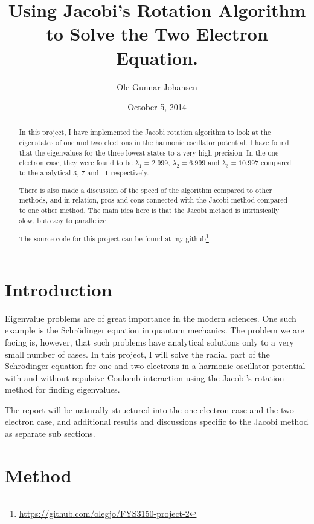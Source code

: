 \documentclass[11pt, a4paper]{article}
\title{Using Jacobi's Rotation Algorithm to Solve the Two Electron \SL Equation.}
\date{October 5, 2014}
\author{Ole Gunnar Johansen}
\newcommand{\SL}{Schr\"{o}dinger }
\begin{document}
	\maketitle
	
	\begin{abstract}
		In this project, I have implemented the Jacobi rotation algorithm to look at the eigenstates of one and two electrons in the harmonic oscillator potential. I have found that the eigenvalues for the three lowest states to a very high precision. In the one electron case, they were found to be $\lambda_1 = 2.999$, $\lambda_2 = 6.999$ and $\lambda_3 = 10.997$ compared to the analytical 3, 7 and 11 respectively.
		
		There is also made a discussion of the speed of the algorithm compared to other methods, and in relation, pros and cons connected with the Jacobi method compared to one other method. The main idea here is that the Jacobi method is intrinsically  slow, but easy to parallelize. 
		
		The source code for this project can be found at my github\footnote{\url{https://github.com/olegjo/FYS3150-project-2}}.
	\end{abstract}
	
	\section{Introduction}
		Eigenvalue problems are of great importance in the modern sciences. One such example is the \SL equation in quantum mechanics. The problem we are facing is, however, that such problems have analytical solutions only to a very small number of cases. In this project, I will solve the radial part of the \SL equation for one and two electrons in a harmonic oscillator potential with and without repulsive Coulomb interaction using the Jacobi's rotation method for finding eigenvalues.
		
		The report will be naturally structured into the one electron case and the two electron case, and additional results and discussions specific to the Jacobi method as separate sub sections.

	
	\section{Method}
\end{document}
